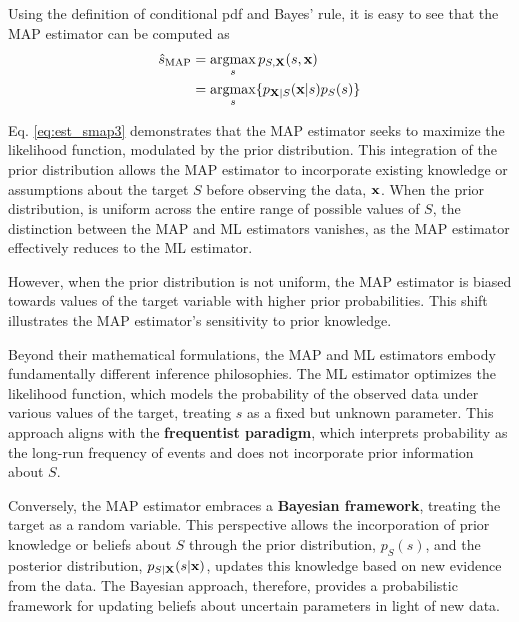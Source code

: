 {Using the definition of conditional pdf and Bayes' rule, it is easy to see that the MAP estimator can be computed as
\begin{align}
\label{eq:est_smap2}
\hat s_{\text{MAP}} 
	&= \operatorname*{argmax}_{s} p_{{S,\bf X}}(s,{\bf x})   \\
\label{eq:est_smap3}
    &= \operatorname*{argmax}_{s} \{p_{{\bf X}|S}({\bf x}|s) p_S(s)\}
\end{align}}

{Eq. \eqref{eq:est_smap3} demonstrates that the MAP estimator seeks to maximize the likelihood function, modulated by the prior distribution. This integration of the prior distribution allows the MAP estimator to incorporate existing knowledge or assumptions about the target $S$ before observing the data, ${\bf x}$. When the prior distribution, is uniform across the entire range of possible values of $S$, the distinction between the MAP and ML estimators vanishes, as the MAP estimator effectively reduces to the ML estimator.}

{However, when the prior distribution is not uniform, the MAP estimator is biased towards values of the target variable with higher prior probabilities. This shift illustrates the MAP estimator's sensitivity to prior knowledge.}

{Beyond their mathematical formulations, the MAP and ML estimators embody fundamentally different inference philosophies. The ML estimator optimizes the likelihood function, which models the probability of the observed data under various values of the target, treating $s$ as a fixed but unknown parameter. This approach aligns with the \textbf{frequentist paradigm}, which interprets probability as the long-run frequency of events and does not incorporate prior information about $S$.}

{Conversely, the MAP estimator embraces a \textbf{Bayesian framework}, treating the target as a random variable. This perspective allows the incorporation of prior knowledge or beliefs about $S$ through the prior distribution, $p_S(s)$, and the posterior distribution, $p_{{S|\bf X}}(s|{\bf x})$, updates this knowledge based on new evidence from the data. The Bayesian approach, therefore, provides a probabilistic framework for updating beliefs about uncertain parameters in light of new data.}

